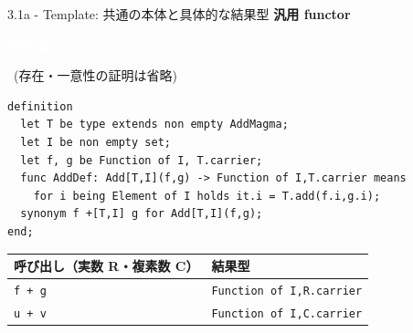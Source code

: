 \documentclass[dvipdfmx,aspectratio=169,11pt]{beamer}
\newcommand{\statusbadge}[2]{\colorbox{#1}{\textcolor{white}{\strut\scriptsize\sffamily\bfseries #2}}}
\newcommand{\badgeSketch}{\statusbadge{orange!75!black}{sketch}}
\begin{document}
\begin{frame}[fragile,t]{3.1a - Template: 共通の本体と具体的な結果型}
\smallskip
\textbf{汎用 functor}~\badgeSketch~{\footnotesize(存在・一意性の証明は省略)}
\begin{lstlisting}[language={mizar},basicstyle=\ttfamily\footnotesize]
definition
  let T be type extends non empty AddMagma;
  let I be non empty set;
  let f, g be Function of I, T.carrier;
  func AddDef: Add[T,I](f,g) -> Function of I,T.carrier means
    for i being Element of I holds it.i = T.add(f.i,g.i);
  synonym f +[T,I] g for Add[T,I](f,g);
end;
\end{lstlisting}
\begin{footnotesize}
\setlength{\tabcolsep}{3pt}
\renewcommand{\arraystretch}{1.15}
\begin{tabularx}{\textwidth}{>{\raggedright\arraybackslash}X>{\raggedright\arraybackslash}X}
\toprule
\textbf{呼び出し（実数 R・複素数 C）\footnotemark[1]} & \textbf{結果型} \\
\midrule
\texttt{f + g} & \texttt{Function of I,R.carrier} \\
\texttt{u + v} & \texttt{Function of I,C.carrier} \\
\bottomrule
\end{tabularx}
\end{footnotesize}


\end{frame}
\end{document}
